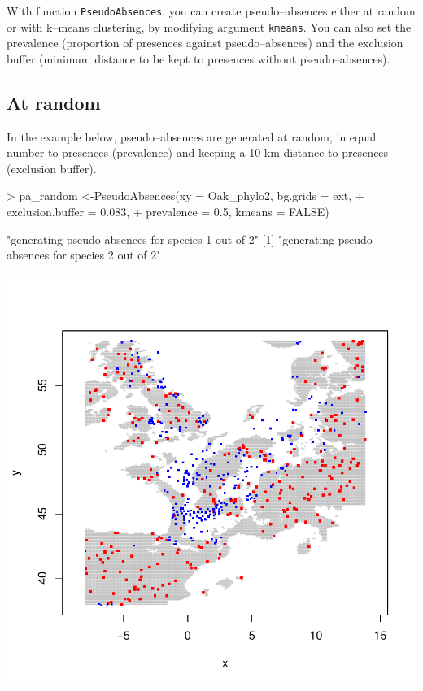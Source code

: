 \documentclass[10pt,a4paper]{report}
\begin{document}
With function \texttt{PseudoAbsences}, you can create pseudo--absences either at random or with k--means clustering, by modifying argument \texttt{kmeans}. You can also set the prevalence (proportion of presences against pseudo--absences) and the exclusion buffer (minimum distance to be kept to presences without pseudo--absences).

\subsection{At random}

In the example below, pseudo--absences are generated at random, in equal number to presences (prevalence) and keeping a 10 km distance to presences (exclusion buffer).



\begin{Schunk}
\begin{Sinput}
> pa_random <-PseudoAbsences(xy = Oak_phylo2, bg.grids = ext, 
+                            exclusion.buffer = 0.083, 
+                            prevalence = 0.5, kmeans = FALSE)
\end{Sinput}
\begin{Soutput}
[1] "generating pseudo-absences for species 1 out of 2"
[1] "generating pseudo-absences for species 2 out of 2"
\end{Soutput}
\end{Schunk}
\includegraphics{mopa-mopa9}
\end{document}
